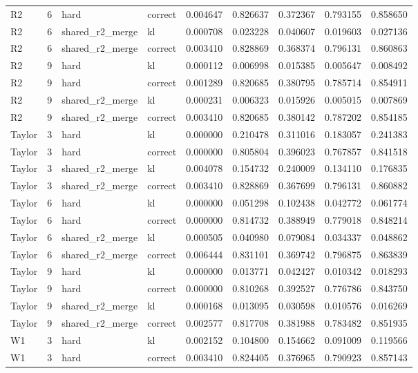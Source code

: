\begin{tabular}{lrllrrrrr}
R2 & 6 & hard & correct & 0.004647 & 0.826637 & 0.372367 & 0.793155 & 0.858650 \\
R2 & 6 & shared_r2_merge & kl & 0.000708 & 0.023228 & 0.040607 & 0.019603 & 0.027136 \\
R2 & 6 & shared_r2_merge & correct & 0.003410 & 0.828869 & 0.368374 & 0.796131 & 0.860863 \\
R2 & 9 & hard & kl & 0.000112 & 0.006998 & 0.015385 & 0.005647 & 0.008492 \\
R2 & 9 & hard & correct & 0.001289 & 0.820685 & 0.380795 & 0.785714 & 0.854911 \\
R2 & 9 & shared_r2_merge & kl & 0.000231 & 0.006323 & 0.015926 & 0.005015 & 0.007869 \\
R2 & 9 & shared_r2_merge & correct & 0.003410 & 0.820685 & 0.380142 & 0.787202 & 0.854185 \\
Taylor & 3 & hard & kl & 0.000000 & 0.210478 & 0.311016 & 0.183057 & 0.241383 \\
Taylor & 3 & hard & correct & 0.000000 & 0.805804 & 0.396023 & 0.767857 & 0.841518 \\
Taylor & 3 & shared_r2_merge & kl & 0.004078 & 0.154732 & 0.240009 & 0.134110 & 0.176835 \\
Taylor & 3 & shared_r2_merge & correct & 0.003410 & 0.828869 & 0.367699 & 0.796131 & 0.860882 \\
Taylor & 6 & hard & kl & 0.000000 & 0.051298 & 0.102438 & 0.042772 & 0.061774 \\
Taylor & 6 & hard & correct & 0.000000 & 0.814732 & 0.388949 & 0.779018 & 0.848214 \\
Taylor & 6 & shared_r2_merge & kl & 0.000505 & 0.040980 & 0.079084 & 0.034337 & 0.048862 \\
Taylor & 6 & shared_r2_merge & correct & 0.006444 & 0.831101 & 0.369742 & 0.796875 & 0.863839 \\
Taylor & 9 & hard & kl & 0.000000 & 0.013771 & 0.042427 & 0.010342 & 0.018293 \\
Taylor & 9 & hard & correct & 0.000000 & 0.810268 & 0.392527 & 0.776786 & 0.843750 \\
Taylor & 9 & shared_r2_merge & kl & 0.000168 & 0.013095 & 0.030598 & 0.010576 & 0.016269 \\
Taylor & 9 & shared_r2_merge & correct & 0.002577 & 0.817708 & 0.381988 & 0.783482 & 0.851935 \\
W1 & 3 & hard & kl & 0.002152 & 0.104800 & 0.154662 & 0.091009 & 0.119566 \\
W1 & 3 & hard & correct & 0.003410 & 0.824405 & 0.376965 & 0.790923 & 0.857143 \\

\end{tabular}
